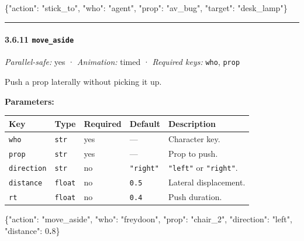 \documentclass[
  12pt,
  letterpaper,
]{book}
\newenvironment{Shaded}{}{}
\newcommand{\DataTypeTok}[1]{\textcolor[rgb]{0.56,0.13,0.00}{#1}}
\newcommand{\DecValTok}[1]{\textcolor[rgb]{0.25,0.63,0.44}{#1}}
\newcommand{\ErrorTok}[1]{\textcolor[rgb]{1.00,0.00,0.00}{\textbf{#1}}}
\newcommand{\FunctionTok}[1]{\textcolor[rgb]{0.02,0.16,0.49}{#1}}
\newcommand{\StringTok}[1]{\textcolor[rgb]{0.25,0.44,0.63}{#1}}
\begin{document}
\begin{Shaded}
\begin{Highlighting}[]
\FunctionTok{\{}\DataTypeTok{"action"}\FunctionTok{:} \StringTok{"stick\_to"}\FunctionTok{,} \DataTypeTok{"who"}\FunctionTok{:} \StringTok{"agent"}\FunctionTok{,} \DataTypeTok{"prop"}\FunctionTok{:} \StringTok{"av\_bug"}\FunctionTok{,}
 \DataTypeTok{"target"}\FunctionTok{:} \StringTok{"desk\_lamp"}\FunctionTok{\}}
\end{Highlighting}
\end{Shaded}

\begin{center}\rule{0.5\linewidth}{0.5pt}\end{center}

\paragraph{\texorpdfstring{3.6.11
\texttt{move\_aside}}{3.6.11 move\_aside}}\label{move_aside}

\emph{Parallel-safe:} yes · \emph{Animation:} timed · \emph{Required
keys:} \texttt{who}, \texttt{prop}

Push a prop laterally without picking it up.

\textbf{Parameters:}

\begin{longtable}[]{@{}lllll@{}}
\toprule\noalign{}
Key & Type & Required & Default & Description \\
\midrule\noalign{}
\endhead
\bottomrule\noalign{}
\endlastfoot
\texttt{who} & \texttt{str} & yes & --- & Character key. \\
\texttt{prop} & \texttt{str} & yes & --- & Prop to push. \\
\texttt{direction} & \texttt{str} & no & \texttt{"right"} &
\texttt{"left"} or \texttt{"right"}. \\
\texttt{distance} & \texttt{float} & no & \texttt{0.5} & Lateral
displacement. \\
\texttt{rt} & \texttt{float} & no & \texttt{0.4} & Push duration. \\
\end{longtable}

\begin{Shaded}
\begin{Highlighting}[]
\FunctionTok{\{}\DataTypeTok{"action"}\FunctionTok{:} \StringTok{"move\_aside"}\FunctionTok{,} \DataTypeTok{"who"}\FunctionTok{:} \StringTok{"freydoon"}\FunctionTok{,} \DataTypeTok{"prop"}\FunctionTok{:} \StringTok{"chair\_2"}\FunctionTok{,}
 \DataTypeTok{"direction"}\FunctionTok{:} \StringTok{"left"}\FunctionTok{,} \DataTypeTok{"distance"}\FunctionTok{:} \DecValTok{0}\ErrorTok{.}\DecValTok{8}\FunctionTok{\}}
\end{Highlighting}
\end{Shaded}
\end{document}
